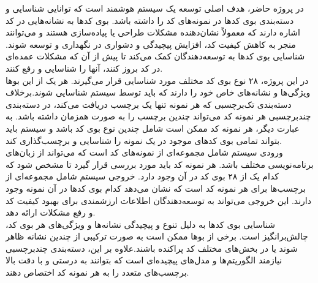 در پروژه حاضر، هدف اصلی توسعه یک سیستم هوشمند است که توانایی شناسایی و دسته‌بندی بوی کدها در نمونه‌های کد را داشته باشد. بوی کدها به نشانه‌هایی در کد اشاره دارند که معمولاً نشان‌دهنده مشکلات طراحی یا پیاده‌سازی هستند و می‌توانند منجر به کاهش کیفیت کد، افزایش پیچیدگی و دشواری در نگهداری و توسعه شوند. شناسایی بوی کدها به توسعه‌دهندگان کمک می‌کند تا پیش از آن که مشکلات عمده‌ای در کد بروز کنند، آنها را شناسایی و رفع کنند.
\\
در این پروژه، ۲۸ نوع بوی کد مختلف مورد شناسایی قرار می‌گیرند. هر یک از این بوها ویژگی‌ها و نشانه‌های خاص خود را دارند که باید توسط سیستم شناسایی شوند.برخلاف دسته‌بندی تک‌برچسبی که هر نمونه تنها یک برچسب دریافت می‌کند، در دسته‌بندی چندبرچسبی هر نمونه کد می‌تواند چندین برچسب را به صورت همزمان داشته باشد. به عبارت دیگر، هر نمونه کد ممکن است شامل چندین نوع بوی کد باشد و سیستم باید بتواند تمامی بوی کدهای موجود در یک نمونه را شناسایی و برچسب‌گذاری کند.
\\
ورودی سیستم شامل مجموعه‌ای از نمونه‌های کد است که می‌تواند از زبان‌های برنامه‌نویسی مختلف باشد. هر نمونه کد باید مورد بررسی قرار گیرد تا مشخص شود که کدام یک از ۲۸ بوی کد در آن وجود دارد.
خروجی سیستم شامل مجموعه‌ای از برچسب‌ها برای هر نمونه کد است که نشان می‌دهد کدام بوی کدها در آن نمونه وجود دارند. این خروجی می‌تواند به توسعه‌دهندگان اطلاعات ارزشمندی برای بهبود کیفیت کد و رفع مشکلات ارائه دهد.
\\
شناسایی بوی کدها به دلیل تنوع و پیچیدگی نشانه‌ها و ویژگی‌های هر بوی کد، چالش‌برانگیز است. برخی از بوها ممکن است به صورت ترکیبی از چندین نشانه ظاهر شوند یا در بخش‌های مختلف کد پراکنده باشند.علاوه بر این، دسته‌بندی چندبرچسبی نیازمند الگوریتم‌ها و مدل‌های پیچیده‌ای است که بتوانند به درستی و با دقت بالا برچسب‌های متعدد را به هر نمونه کد اختصاص دهند.

